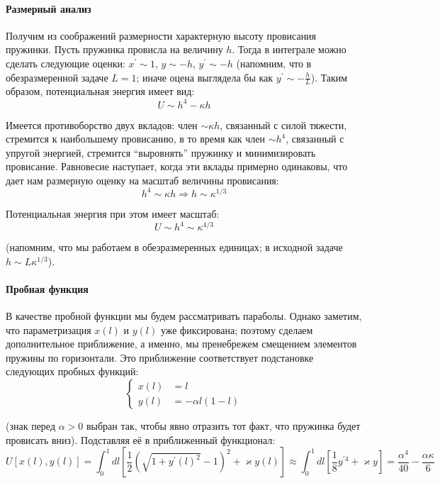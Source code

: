\documentclass[a4paper,12pt]{article}
\begin{document}
\paragraph{Размерный анализ}

Получим из соображений размерности характерную высоту провисания пружинки.
Пусть пружинка провисла на величину $h$. Тогда в интеграле можно
сделать следующие оценки: $x^{\prime}\sim1$, $y\sim-h$, $y^{\prime}\sim-h$
(напомним, что в обезразмеренной задаче $L=1$; иначе оцена выглядела
бы как $y^{\prime}\sim-\frac{h}{L}$). Таким образом, потенциальная
энергия имеет вид:
\[
U\sim h^{4}-\kappa h
\]

\noindent
Имеется противоборство двух вкладов: член $\sim\kappa h$, связанный
с силой тяжести, стремится к наибольшему провисанию, в то время как
член $\sim h^{4}$, связанный с упругой энергией, стремится ``выровнять''
пружинку и минимизировать провисание. Равновесие наступает, когда
эти вклады примерно одинаковы, что дает нам размерную оценку на масштаб
величины провисания:
\[
h^{4}\sim\kappa h\Rightarrow h\sim\kappa^{1/3}
\]

\noindent
Потенциальная энергия при этом имеет масштаб:
\[
U\sim h^{4}\sim\kappa^{4/3}
\]

\noindent
(напомним, что мы работаем в обезразмеренных единицах; в исходной задаче
$h\sim L\kappa^{1/3}$). 


\paragraph{Пробная функция}

В качестве пробной функции мы будем рассматривать параболы. Однако
заметим, что параметризация $x(l)$ и $y(l)$ уже фиксирована; поэтому
сделаем дополнительное приближение, а именно, мы пренебрежем смещением
элементов пружины по горизонтали. Это приближение соответствует подстановке
следующих пробных функций: 
\[
\begin{cases}
x(l) & =l\\
y(l) & =-\alpha l(1-l)
\end{cases}
\]

\noindent
(знак перед $\alpha>0$ выбран так, чтобы явно отразить тот факт,
что пружинка будет провисать вниз). Подставляя её в приближенный функционал:
\[
U[x(l),y(l)]=\int_{0}^{1}dl\left[\frac{1}{2}\left(\sqrt{1+y^{\prime}(l)^{2}}-1\right)^{2}+\varkappa y(l)\right]
\approx\int_{0}^{1}dl\left[\frac{1}{8}y^{\prime4}+\varkappa y\right]=\frac{\alpha^{4}}{40}-\frac{\alpha\kappa}{6}
\]
\end{document}
